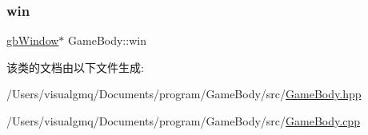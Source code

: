 \subsubsection{\texorpdfstring{win}{win}}
{\footnotesize\ttfamily \mbox{\hyperlink{classgb_window}{gb\+Window}}$\ast$ Game\+Body\+::win\hspace{0.3cm}{\ttfamily [protected]}}



该类的文档由以下文件生成\+:\begin{DoxyCompactItemize}
\item 
/\+Users/visualgmq/\+Documents/program/\+Game\+Body/src/\mbox{\hyperlink{_game_body_8hpp}{Game\+Body.\+hpp}}\item 
/\+Users/visualgmq/\+Documents/program/\+Game\+Body/src/\mbox{\hyperlink{_game_body_8cpp}{Game\+Body.\+cpp}}\end{DoxyCompactItemize}
